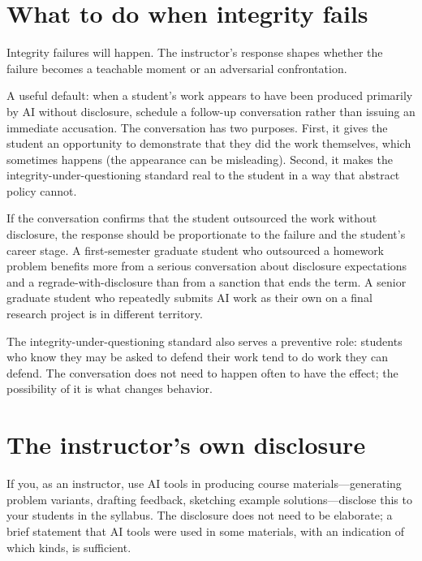 \documentclass[11pt]{book}
\begin{document}
\section{What to do when integrity fails}

Integrity failures will happen. The instructor's response shapes whether the failure becomes a teachable moment or an adversarial confrontation.

A useful default: when a student's work appears to have been produced primarily by AI without disclosure, schedule a follow-up conversation rather than issuing an immediate accusation. The conversation has two purposes. First, it gives the student an opportunity to demonstrate that they did the work themselves, which sometimes happens (the appearance can be misleading). Second, it makes the integrity-under-questioning standard real to the student in a way that abstract policy cannot.

If the conversation confirms that the student outsourced the work without disclosure, the response should be proportionate to the failure and the student's career stage. A first-semester graduate student who outsourced a homework problem benefits more from a serious conversation about disclosure expectations and a regrade-with-disclosure than from a sanction that ends the term. A senior graduate student who repeatedly submits AI work as their own on a final research project is in different territory.

The integrity-under-questioning standard also serves a preventive role: students who know they may be asked to defend their work tend to do work they can defend. The conversation does not need to happen often to have the effect; the possibility of it is what changes behavior.

\section{The instructor's own disclosure}

If you, as an instructor, use AI tools in producing course materials---generating problem variants, drafting feedback, sketching example solutions---disclose this to your students in the syllabus. The disclosure does not need to be elaborate; a brief statement that AI tools were used in some materials, with an indication of which kinds, is sufficient.
\end{document}
